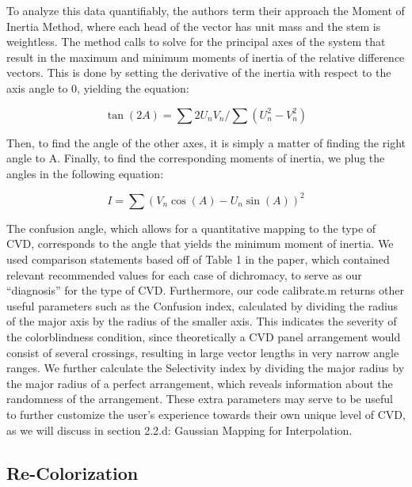 \documentclass[10pt,twocolumn,letterpaper]{article}
\begin{document}
To analyze this data quantifiably, the authors term their approach the Moment of Inertia Method, where each head of the vector has unit mass and the stem is weightless. The method calls to solve for the principal axes of the system that result in the maximum and minimum moments of inertia of the relative difference vectors. This is done by setting the derivative of the inertia with respect to the axis angle to 0, yielding the equation: 

\begin{equation}\label{inertia1}
\tan(2A) = \sum 2U_nV_n / \sum (U_n^{2} - V_n^{2})
\end{equation}

Then, to find the angle of the other axes, it is simply a matter of finding the right angle to A. 
Finally, to find the corresponding moments of inertia, we plug the angles in the following equation:

\begin{equation}\label{inertia2}
I = \sum (V_n\cos(A) - U_n\sin(A))^{2}
\end{equation}

The confusion angle, which allows for a quantitative mapping to the type of CVD, corresponds to the angle that yields the minimum moment of inertia. We used comparison statements based off of Table 1 in the paper, which contained relevant recommended values for each case of dichromacy, to serve as our “diagnosis” for the type of CVD. Furthermore, our code calibrate.m returns other useful parameters such as the Confusion index, calculated by dividing the radius of the major axis by the radius of the smaller axis. This indicates the severity of the colorblindness condition, since theoretically a CVD panel arrangement would consist of several crossings, resulting in large vector lengths in very narrow angle ranges. We further calculate the Selectivity index by dividing the major radius by the major radius of a perfect arrangement, which reveals information about the randomness of the arrangement. These extra parameters may serve to be useful to further customize the user’s experience towards their own unique level of CVD, as we will discuss in section 2.2.d: Gaussian Mapping for Interpolation. 


\subsection{Re-Colorization}
\end{document}
